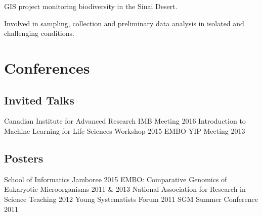 \documentclass[]{Finlay_Maguire_CV}
\begin{document}
\begin{minipage}[t]{0.66\textwidth}
\begin{tightemize}
\item GIS project monitoring biodiversity in the Sinai Desert.
\item Involved in sampling, collection and preliminary data analysis in isolated and challenging conditions.
\end{tightemize}
\sectionsep


\section{Conferences}

\subsection{Invited Talks}
    Canadian Institute for Advanced Research IMB Meeting 2016 \textbullet{}
    Introduction to Machine Learning for Life Sciences Workshop 2015 \textbullet{}
EMBO YIP Meeting 2013\\
\subsection{Posters}

School of Informatics Jamboree 2015 \textbullet{} 
    EMBO: Comparative Genomics of Eukaryotic Microorganisms 2011 \& 2013 \textbullet{}
    National Association for Research in Science Teaching 2012 \textbullet{}
    Young Systematists Forum 2011 \textbullet{} SGM Summer Conference 2011 \\

\sectionsep



\end{minipage}
\end{document}
